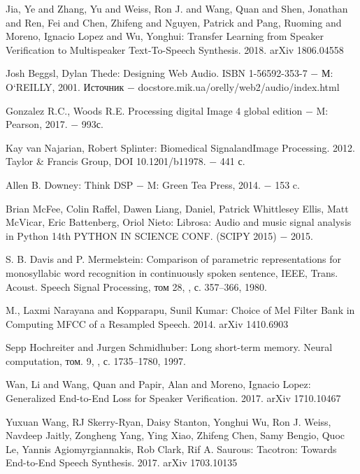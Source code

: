\documentclass[oneside,final,14pt]{extreport}
\begin{document}
\begin{thebibliography}{0}

 Jia, Ye and Zhang, Yu and Weiss, Ron J. and Wang, Quan and Shen, Jonathan and Ren, Fei and Chen, Zhifeng and Nguyen, Patrick and Pang, Ruoming and Moreno, Ignacio Lopez and Wu, Yonghui: Transfer Learning from Speaker Verification to Multispeaker Text-To-Speech Synthesis. 2018. arXiv 1806.04558

 Josh Beggsl, Dylan Thede: Designing Web Audio. ISBN 1-56592-353-7 $-$ М: O`REILLY, 2001. Источник $-$ docstore.mik.ua/orelly/web2/audio/index.html

  Gonzalez R.C.,  Woods R.E. Processing digital Image 4 global edition $-$ M: Pearson, 2017. $-$ 993с.

Kay van Najarian, Robert Splinter: Biomedical SignalandImage Processing. 2012. Taylor \& Francis Group, DOI 10.1201/b11978. $-$ 441 с.


 Allen B. Downey: Think DSP $-$ M: Green Tea Press, 2014. $-$ 153 c.

 Brian McFee, Colin Raffel, Dawen Liang, Daniel, Patrick Whittlesey Ellis, Matt McVicar, Eric Battenberg, Oriol Nieto: Librosa: Audio and music signal analysis in Python  14th PYTHON IN SCIENCE CONF. (SCIPY 2015) $-$ 2015.

 S. B. Davis and P. Mermelstein: Comparison of parametric representations for monosyllabic word recognition in continuously spoken sentence, IEEE, Trans. Acoust. Speech Signal Processing, том 28, , с. 357–366, 1980.

M., Laxmi Narayana and Kopparapu, Sunil Kumar: Choice of Mel Filter Bank in Computing MFCC of a Resampled Speech. 2014. arXiv 1410.6903

 Sepp Hochreiter and Jurgen Schmidhuber: Long short-term memory. Neural computation, том. 9, , с. 1735–1780, 1997.

 Wan, Li and Wang, Quan and Papir, Alan and Moreno, Ignacio Lopez: Generalized End-to-End Loss for Speaker Verification. 2017. arXiv 1710.10467

 Yuxuan Wang, RJ Skerry-Ryan, Daisy Stanton, Yonghui Wu, Ron J. Weiss, Navdeep Jaitly, Zongheng Yang, Ying Xiao, Zhifeng Chen, Samy Bengio, Quoc Le, Yannis Agiomyrgiannakis, Rob Clark, Rif A. Saurous: Tacotron: Towards End-to-End Speech Synthesis. 2017. arXiv 1703.10135


\end{thebibliography}
\end{document}
